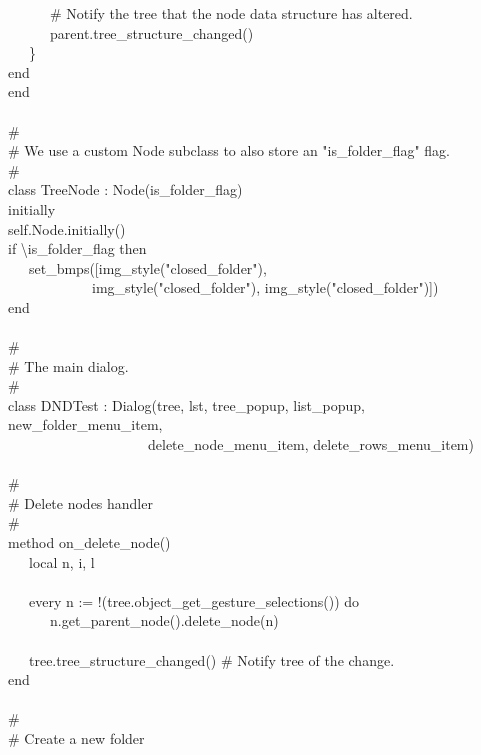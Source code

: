 {\>   \ \ \ \ \ \ \# Notify the tree that the node data structure has altered. \\
\>   \ \ \ \ \ \ parent.tree\_structure\_changed() \\
\>   \ \ \ \} \\
\>   end \\
end \\
\ \\
\# \\
\# We use a custom Node subclass to also store an
"is\_folder\_flag" flag. \\
\# \\
class TreeNode : Node(is\_folder\_flag) \\
initially \\
\>   self.Node.initially() \\
\>   if {\textbackslash}is\_folder\_flag then \\
\>   \ \ \ set\_bmps([img\_style("closed\_folder"), \\
\>   \ \ \ \ \ \ \ \ \ \ \ \ img\_style("closed\_folder"),
img\_style("closed\_folder")]) \\
end \\
\ \\
\# \\
\# The main dialog. \\
\# \\
class DNDTest : Dialog(tree, lst, tree\_popup, list\_popup, new\_folder\_menu\_item,  \\
\>   \ \ \ \ \ \ \ \ \ \ \ \ \ \ \ \ \ \ \ \ delete\_node\_menu\_item, delete\_rows\_menu\_item) \\
\ \\
\>   \# \\
\>   \# Delete nodes handler \\
\>   \# \\
\>   method on\_delete\_node() \\
\>   \ \ \ local n, i, l \\
\ \\
\>   \ \ \ every n := !(tree.object\_get\_gesture\_selections()) do \\
\>   \ \ \ \ \ \ n.get\_parent\_node().delete\_node(n) \\
\ \\
\>   \ \ \ tree.tree\_structure\_changed() \# Notify tree of the change.\\
\>   end \\
\ \\
\>   \# \\
\>   \# Create a new folder \\
}
